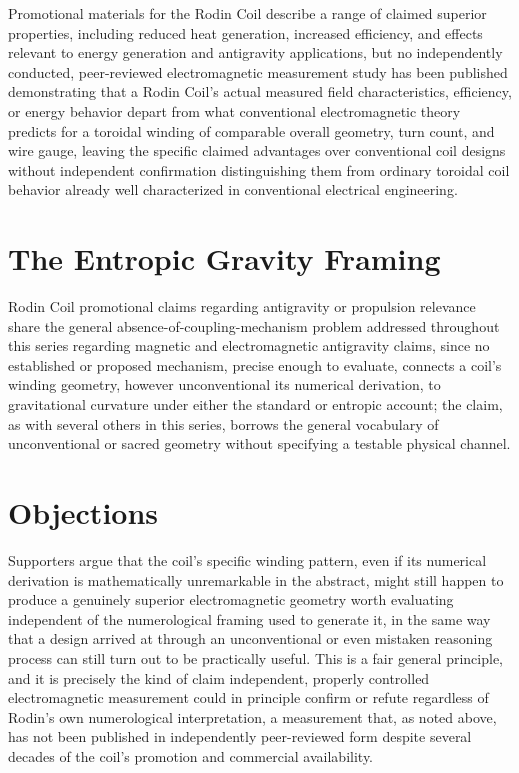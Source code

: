 \documentclass[11pt]{article}
\begin{document}
Promotional materials for the Rodin Coil describe a range of claimed superior properties, including reduced heat generation, increased efficiency, and effects relevant to energy generation and antigravity applications, but no independently conducted, peer-reviewed electromagnetic measurement study has been published demonstrating that a Rodin Coil's actual measured field characteristics, efficiency, or energy behavior depart from what conventional electromagnetic theory predicts for a toroidal winding of comparable overall geometry, turn count, and wire gauge, leaving the specific claimed advantages over conventional coil designs without independent confirmation distinguishing them from ordinary toroidal coil behavior already well characterized in conventional electrical engineering.

\section{The Entropic Gravity Framing}

Rodin Coil promotional claims regarding antigravity or propulsion relevance share the general absence-of-coupling-mechanism problem addressed throughout this series regarding magnetic and electromagnetic antigravity claims, since no established or proposed mechanism, precise enough to evaluate, connects a coil's winding geometry, however unconventional its numerical derivation, to gravitational curvature under either the standard or entropic account; the claim, as with several others in this series, borrows the general vocabulary of unconventional or sacred geometry without specifying a testable physical channel.

\section{Objections}

Supporters argue that the coil's specific winding pattern, even if its numerical derivation is mathematically unremarkable in the abstract, might still happen to produce a genuinely superior electromagnetic geometry worth evaluating independent of the numerological framing used to generate it, in the same way that a design arrived at through an unconventional or even mistaken reasoning process can still turn out to be practically useful. This is a fair general principle, and it is precisely the kind of claim independent, properly controlled electromagnetic measurement could in principle confirm or refute regardless of Rodin's own numerological interpretation, a measurement that, as noted above, has not been published in independently peer-reviewed form despite several decades of the coil's promotion and commercial availability.
\end{document}
